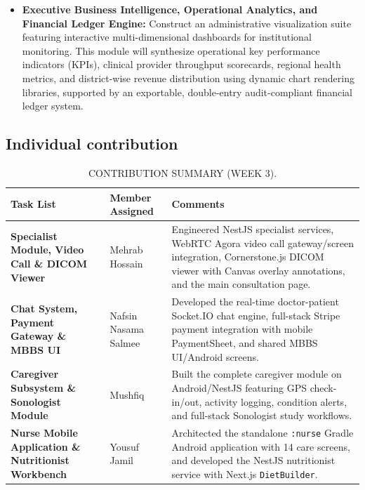 \documentclass[onecolumn,journal]{IEEEtran}
\begin{document}
\begin{itemize}
		\item \textbf{Executive Business Intelligence, Operational Analytics, and Financial Ledger Engine:} Construct an administrative visualization suite featuring interactive multi-dimensional dashboards for institutional monitoring. This module will synthesize operational key performance indicators (KPIs), clinical provider throughput scorecards, regional health metrics, and district-wise revenue distribution using dynamic chart rendering libraries, supported by an exportable, double-entry audit-compliant financial ledger system.
	\end{itemize}
	
	\subsection{Individual contribution}

	
	\begin{table}[H]
		\centering
		\small
		\renewcommand{\arraystretch}{1.3}
		\begin{tabularx}{\textwidth}{>{\raggedright\arraybackslash}p{} >{\raggedright\arraybackslash}p{} >{\raggedright\arraybackslash}X}
			\toprule
			\textbf{Task List} & \textbf{Member Assigned} & \textbf{Comments} \\
			\midrule
			\textbf{Specialist Module, Video Call \& DICOM Viewer} & Mehrab Hossain & Engineered NestJS specialist services, WebRTC Agora video call gateway/screen integration, Cornerstone.js DICOM viewer with Canvas overlay annotations, and the main consultation page. \\
			\textbf{Chat System, Payment Gateway \& MBBS UI} & Nafsin Nasama Salmee & Developed the real-time doctor-patient Socket.IO chat engine, full-stack Stripe payment integration with mobile PaymentSheet, and shared MBBS UI/Android screens. \\
			\textbf{Caregiver Subsystem \& Sonologist Module} & Mushfiq & Built the complete caregiver module on Android/NestJS featuring GPS check-in/out, activity logging, condition alerts, and full-stack Sonologist study workflows. \\
			\textbf{Nurse Mobile Application \& Nutritionist Workbench} & Yousuf Jamil & Architected the standalone \texttt{:nurse} Gradle Android application with 14 care screens, and developed the NestJS nutritionist service with Next.js \texttt{DietBuilder}. \\
			\bottomrule
		\end{tabularx}
		\vspace{8pt}
		\caption{CONTRIBUTION SUMMARY (WEEK 3).}
		\label{tab:contribution_summary_w3}
	\end{table}
	
\end{document}
